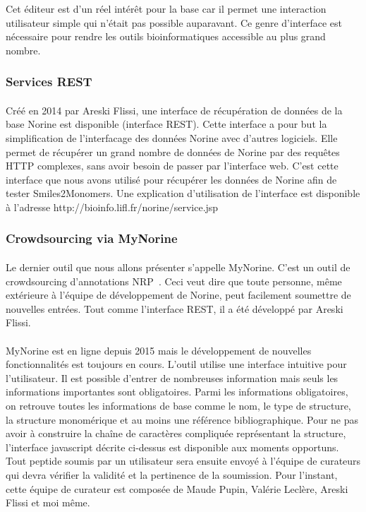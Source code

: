 \documentclass[12pt,french,twoside]{report}
\begin{document}
Cet éditeur est d'un réel intérêt pour la base car il permet une interaction utilisateur simple qui n'était pas possible auparavant.
Ce genre d'interface est nécessaire pour rendre les outils bioinformatiques accessible au plus grand nombre.



\subsubsection{Services REST}

\paragraph{}Créé en 2014 par Areski Flissi, une interface de récupération de données de la base Norine est disponible (interface REST).
Cette interface a pour but la simplification de l'interfacage des données Norine avec d'autres logiciels.
Elle permet de récupérer un grand nombre de données de Norine par des requêtes HTTP complexes, sans avoir besoin de passer par l'interface web.
C'est cette interface que nous avons utilisé pour récupérer les données de Norine afin de tester Smiles2Monomers.
Une explication d'utilisation de l'interface est disponible à l'adresse http://bioinfo.lifl.fr/norine/service.jsp



\subsubsection{Crowdsourcing via MyNorine}

\paragraph{}Le dernier outil que nous allons présenter s'appelle MyNorine.
C'est un outil de crowdsourcing d'annotations NRP~\cite{flissi_norine_2016}.
Ceci veut dire que toute personne, même extérieure à l'équipe de développement de Norine, peut facilement soumettre de nouvelles entrées.
Tout comme l'interface REST, il a été développé par Areski Flissi.

\paragraph{}MyNorine est en ligne depuis 2015 mais le développement de nouvelles fonctionnalités est toujours en cours.
L'outil utilise une interface intuitive pour l'utilisateur.
Il est possible d'entrer de nombreuses information mais seuls les informations importantes sont obligatoires.
Parmi les informations obligatoires, on retrouve toutes les informations de base comme le nom, le type de structure, la structure monomérique et au moins une référence bibliographique.
Pour ne pas avoir à construire la chaîne de caractères compliquée représentant la structure, l'interface javascript décrite ci-dessus est disponible aux moments opportuns.
Tout peptide soumis par un utilisateur sera ensuite envoyé à l'équipe de curateurs qui devra vérifier la validité et la pertinence de la soumission.
Pour l'instant, cette équipe de curateur est composée de Maude Pupin, Valérie Leclère, Areski Flissi et moi même.
\end{document}
